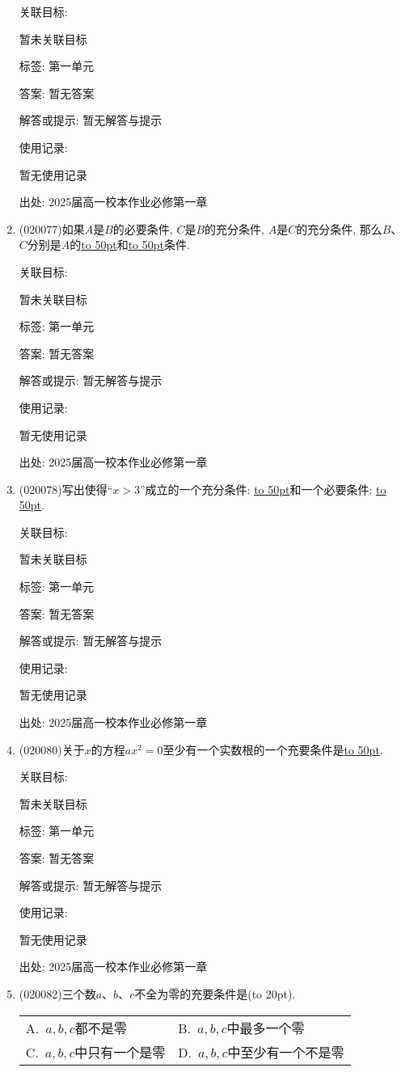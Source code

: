\documentclass[10pt,a4paper]{article}
\newcommand{\blank}[1]{\underline{\hbox to #1pt{}}}
\newcommand{\bracket}[1]{(\hbox to #1pt{})}
\newcommand{\twoch}[4]{\par\begin{tabular}{p{.46\textwidth}p{.46\textwidth}}
A.~#1& B.~#2\\
C.~#3& D.~#4
\end{tabular}}
\begin{document}
\begin{enumerate}[1.]
关联目标:

暂未关联目标



标签: 第一单元

答案: 暂无答案

解答或提示: 暂无解答与提示

使用记录:

暂无使用记录


出处: 2025届高一校本作业必修第一章
\item { (020077)}如果$A$是$B$的必要条件, $C$是$B$的充分条件, $A$是$C$的充分条件, 那么$B$、$C$分别是$A$的\blank{50}和\blank{50}条件.


关联目标:

暂未关联目标



标签: 第一单元

答案: 暂无答案

解答或提示: 暂无解答与提示

使用记录:

暂无使用记录


出处: 2025届高一校本作业必修第一章
\item { (020078)}写出使得``$x>3$''成立的一个充分条件: \blank{50}和一个必要条件: \blank{50}.


关联目标:

暂未关联目标



标签: 第一单元

答案: 暂无答案

解答或提示: 暂无解答与提示

使用记录:

暂无使用记录


出处: 2025届高一校本作业必修第一章
\item { (020080)}关于$x$的方程$ax^2=0$至少有一个实数根的一个充要条件是\blank{50}.


关联目标:

暂未关联目标



标签: 第一单元

答案: 暂无答案

解答或提示: 暂无解答与提示

使用记录:

暂无使用记录


出处: 2025届高一校本作业必修第一章
\item { (020082)}三个数$a$、$b$、$c$不全为零的充要条件是\bracket{20}.
\twoch{$a,b,c$都不是零}{$a,b,c$中最多一个零}{$a,b,c$中只有一个是零}{$a,b,c$中至少有一个不是零}



\end{enumerate}
\end{document}
